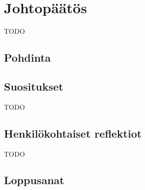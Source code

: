 \vspace{21.5pt}
\chapter{Johtopäätös}

TODO

\section{Pohdinta}



\section{Suositukset}

TODO

\section{Henkilökohtaiset reflektiot}

TODO



\section{Loppusanat}